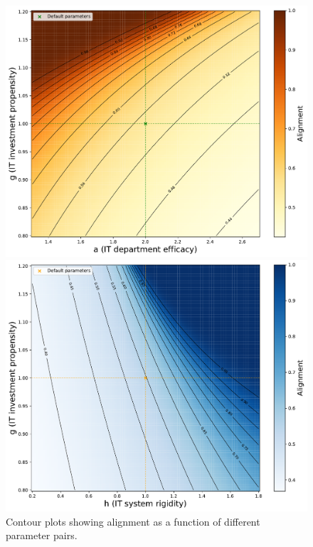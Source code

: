 \documentclass[a4paper, 10pt]{article}
\begin{document}
\begin{figure}[h]
    \begin{minipage}[b]{0.48\textwidth}
        \includegraphics[width=\textwidth]{../images/int-cases/sim-3.pdf}
    \end{minipage}
    \hfill
    \begin{minipage}[b]{0.48\textwidth}
        \includegraphics[width=\textwidth]{../images/int-cases/sim-4.pdf}
    \end{minipage}
    \caption{Contour plots showing alignment as a function of different parameter pairs.}
    \label{fig:alignment-contour-plots}
\end{figure}
\end{document}
